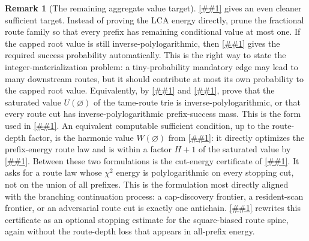 \documentclass[10pt]{article}
\newcommand{\cref}[1]{\ref{##1}}
\newcommand{\Cref}[1]{\ref{##1}}
\theoremstyle{definition}
\newtheorem{remark}[theorem]{Remark}
\begin{document}
\begin{remark}[The remaining aggregate value target]
   \Cref{lem:unit-capped-value-flow} gives an even cleaner sufficient target.
   Instead of proving the LCA energy directly, prune the fractional route
   family so that every prefix has remaining conditional value at most one.
   If the capped root value is still inverse-polylogarithmic, then
   \cref{cor:capped-flow-delivery} gives the required success probability
   automatically. This is the right way to state the integer-materialization
   problem: a tiny-probability mandatory edge may lead to many downstream
   routes, but it should contribute at most its own probability to the capped
   root value. Equivalently, by \cref{lem:saturated-value-recursion} and
   \cref{lem:saturated-value-mincut}, prove that the saturated value
   $U(\varnothing)$ of the tame-route trie is inverse-polylogarithmic, or that
   every route cut has inverse-polylogarithmic prefix-success mass. This is the
   form used in \cref{asm:aggregate-value-delivery}. An equivalent
   computable sufficient condition, up to the route-depth factor, is the
   harmonic value
   $W(\varnothing)$ from \cref{lem:optimal-prefix-energy-law}: it directly
   optimizes the prefix-energy route law and is within a factor
   $H+1$ of the saturated value by
   \cref{lem:harmonic-saturated-comparison}.
   Between these two formulations is the cut-energy certificate of
   \cref{lem:cut-energy-route-law}.  It asks for a route law whose
   $\chi^2$ energy is polylogarithmic on every stopping cut, not on the union of
   all prefixes.  This is the formulation most directly aligned with the
   branching continuation process: a cap-discovery frontier, a resident-scan
   frontier, or an adversarial route cut is exactly one antichain.
   \Cref{lem:frontier-square-toll} rewrites this certificate as an optional
   stopping estimate for the square-biased route spine, again without the
   route-depth loss that appears in all-prefix energy.
\end{remark}
\end{document}
